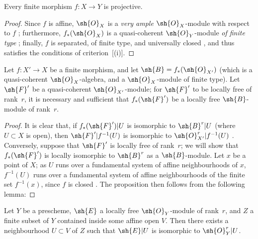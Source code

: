 \begin{corollary}[6.1.11]
\label{II.6.1.11}
Every finite morphism $f:X\to Y$ is projective.
\end{corollary}

\begin{proof}
Since $f$ is affine, $\sh{O}_X$ is a \emph{very ample} $\sh{O}_X$-module with respect to $f$ ;
furthermore, $f_*(\sh{O}_X)$ is a quasi-coherent $\sh{O}_Y$-module \emph{of finite type} ;
finally, $f$ is separated, of finite type, and universally closed , and thus satisfies the conditions of criterion~[(i)].
\end{proof}

\begin{proposition}[6.1.12]
\label{II.6.1.12}
Let $f:X'\to X$ be a finite morphism, and let $\sh{B}=f_*(\sh{O}_{X'})$ (which is a quasi-coherent $\sh{O}_X$-algebra, and a $\sh{O}_X$-module of finite type).
Let $\sh{F}'$ be a quasi-coherent $\sh{O}_{X'}$-module;
for $\sh{F}'$ to be locally free of rank~$r$, it is necessary and sufficient that $f_*(\sh{F}')$ be a locally free $\sh{B}$-module of rank~$r$.
\end{proposition}

\begin{proof}
It is clear that, if $f_*(\sh{F}')|U$ is isomorphic to $\sh{B}^r|U$ (where $U\subset X$ is open), then $\sh{F}'|f^{-1}(U)$ is isomorphic to $\sh{O}_{X'}^r|f^{-1}(U)$ .
Conversely, suppose that $\sh{F}'$ is locally free of rank~$r$; we will show that $f_*(\sh{F}')$ is locally isomorphic to $\sh{B}^r$ as a $\sh{B}$-module.
Let $x$ be a point of $X$;
as $U$ runs over a fundamental system of affine neighbourhoods of $x$, $f^{-1}(U)$ runs over a fundamental system of affine neighbourhoods  of the finite set $f^{-1}(x)$, since $f$ is closed .
The proposition then follows from the following lemma:
\end{proof}

\begin{lemma}[6.1.12.1]
\label{II.6.1.12.1}
Let $Y$ be a prescheme, $\sh{E}$ a locally free $\sh{O}_Y$-module of rank~$r$, and $Z$ a finite subset of $Y$ contained inside some affine open $V$.
Then there exists a neighbourhood $U\subset V$ of $Z$ such that $\sh{E}|U$ is isomorphic to $\sh{O}_Y^r|U$.
\end{lemma}


